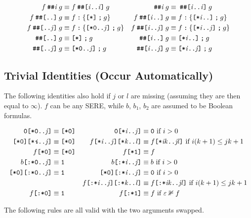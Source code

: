 \documentclass[a4paper,twoside,10pt,DIV=12]{scrreprt}
\newcommand{\FUSION}{\mathbin{\texttt{:}}}
\newcommand{\CONCAT}{\mathbin{\texttt{;}}}
\newcommand{\DELAY}[1]{\mathbin{\texttt{\#\##1}}}
\newcommand{\DELAYR}[1]{\mathbin{\texttt{\#\#[#1]}}}
\newcommand{\0}{\texttt{0}}
\newcommand{\1}{\texttt{1}}
\newcommand{\STAR}[1]{\texttt{[*#1]}}
\newcommand{\FSTAR}[1]{\texttt{[:*#1]}}
\newcommand{\eword}{\texttt{[*0]}}
\newcommand\var[1]{{\ttfamily\itshape #1}}
\newcommand\mvar[1]{\ensuremath{\mathit{#1}}}
\newcommand\samp[1]{`\texttt{#1}'}
\begin{document}
\begin{align*}
  f\DELAY{\mvar{i}} g &\equiv f\DELAYR{\mvar{i}..\mvar{i}} g & {}\DELAY{\mvar{i}} g &\equiv {}\DELAYR{\mvar{i}..\mvar{i}} g\\
  f\DELAYR{..} g &\equiv f\FUSION\{\STAR{}\CONCAT g\} & f\DELAYR{\mvar{i}..} g &\equiv f\FUSION\{\STAR{\mvar{i}..}\CONCAT g\} \\
  f\DELAYR{..\mvar{j}} g &\equiv f\FUSION\{\STAR{0..\mvar{j}}\CONCAT g\} &
  f\DELAYR{\mvar{i}..\mvar{j}} g &\equiv f\FUSION\{\STAR{\mvar{i}..\mvar{j}}\CONCAT g\} \\
  {}\DELAYR{..} g &\equiv \STAR{}\CONCAT g & {}\DELAYR{\mvar{i}..} g &\equiv \STAR{\mvar{i}..}\CONCAT g \\
  {}\DELAYR{..\mvar{j}} g &\equiv \STAR{0..\mvar{j}}\CONCAT g &
  {}\DELAYR{\mvar{i}..\mvar{j}} g &\equiv \STAR{\mvar{i}..\mvar{j}}\CONCAT g
\end{align*}
\subsection{Trivial Identities (Occur Automatically)}

The following identities also hold if $j$ or $l$ are missing (assuming
they are then equal to $\infty$).  $f$ can be any SERE, while $b$,
$b_1$, $b_2$ are assumed to be Boolean formulas.

\begin{align*}
  \0\STAR{0..\mvar{j}} &\equiv \eword  &
  \0\STAR{\mvar{i}..\mvar{j}} &\equiv \0 \text{~if~}i>0 \\
  \eword\STAR{\var{i}..\mvar{j}} &\equiv \eword&
  f\STAR{\mvar{i}..\mvar{j}}\STAR{\mvar{k}..\mvar{l}} &\equiv f\STAR{\mvar{ik}..\mvar{jl}}\text{~if~}i(k+1)\le jk+1 \\
  f\STAR{0}&\equiv \eword &
  f\STAR{1}&\equiv f\\
  b\FSTAR{0..\mvar{j}} &\equiv \1  &
  b\FSTAR{\mvar{i}..\mvar{j}} &\equiv b \text{~if~}i>0 \\
  \eword\FSTAR{0..\mvar{j}} &\equiv \1&
  \eword\FSTAR{\mvar{i}..\mvar{j}} &\equiv \0\text{~if~}i>0 \\
  &&
  f\FSTAR{\mvar{i}..\mvar{j}}\FSTAR{\mvar{k}..\mvar{l}} &\equiv f\FSTAR{\mvar{ik}..\mvar{jl}}\text{~if~}i(k+1)\le jk+1 \\
  f\FSTAR{0}&\equiv \1 &
  f\FSTAR{1}&\equiv f\text{~if~}\varepsilon\nVDash f\\
\end{align*}

\noindent
The following rules are all valid with the two arguments swapped.
\end{document}
